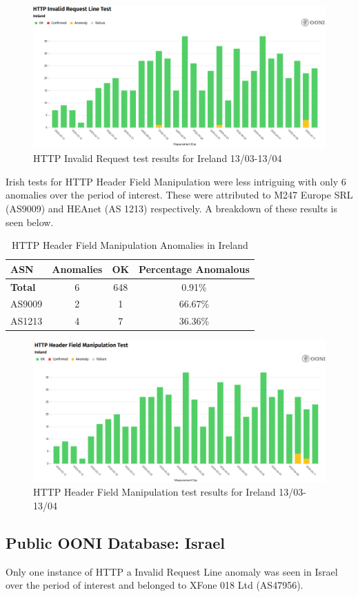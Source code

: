 \begin{figure} [H]
    \centering
    \includegraphics[width=0.5\linewidth]{IREOONIDBMB1.png}
    \caption{HTTP Invalid Request test results for Ireland 13/03-13/04}
    \label{fig:enter-label}
\end{figure}

Irish tests for HTTP Header Field Manipulation were less intriguing with only 6 anomalies over the period of interest. These were attributed to M247 Europe SRL (AS9009) and HEAnet (AS 1213) respectively. A breakdown of these results is seen below.


\begin{table}[H]
\centering
\caption{HTTP Header Field Manipulation Anomalies in Ireland}
\begin{tabular}{lccc}
\toprule
\textbf{ASN} & \textbf{Anomalies} & \textbf{OK} & \textbf{Percentage Anomalous} \\
\midrule
\textbf{Total}   & 6 & 648 & 0.91\% \\
\midrule
AS9009           & 2 & 1   & 66.67\% \\
AS1213           & 4 & 7   & 36.36\% \\
\bottomrule
\end{tabular}
\label{tab:http_header_ireland}
\end{table}

\begin{figure} [H]
    \centering
    \includegraphics[width=0.5\linewidth]{IREOONIDBMB2.png}
    \caption{HTTP Header Field Manipulation test results for Ireland 13/03-13/04}
    \label{fig:enter-label}
\end{figure}


\subsection{Public OONI Database: Israel}
Only one instance of HTTP a Invalid Request Line anomaly was seen in Israel over the period of interest and belonged to XFone 018 Ltd (AS47956). 


